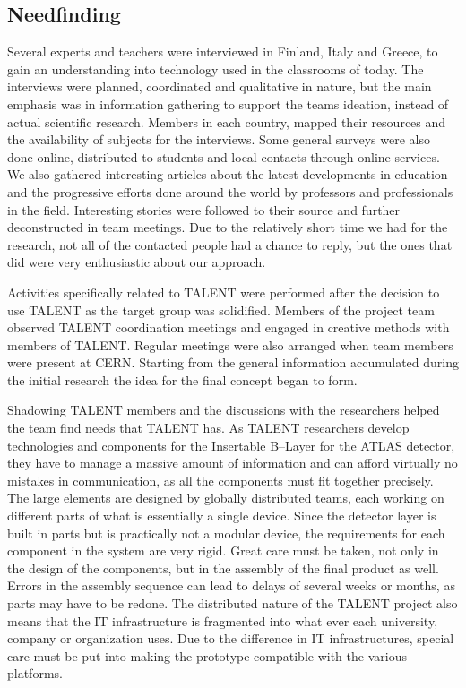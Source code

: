 \documentclass[english,12pt,a4paper,dvips]{article}
\begin{document}
\subsection{Needfinding}

Several experts and teachers were interviewed in Finland, Italy and Greece, to gain an understanding into technology used in the classrooms of today. The interviews were planned, coordinated and qualitative in nature, but the main emphasis was in information gathering to support the teams ideation, instead of actual scientific research. Members in each country, mapped their resources and the availability of subjects for the interviews. Some general surveys were also done online, distributed to students and local contacts through online services. We also gathered interesting articles about the latest developments in education and the progressive efforts done around the world by professors and professionals in the field. Interesting stories were followed to their source and further deconstructed in team meetings. Due to the relatively short time we had for the research, not all of the contacted people had a chance to reply, but the ones that did were very enthusiastic about our approach.

Activities specifically related to TALENT were performed after the decision to use TALENT as the target group was solidified. Members of the project team observed TALENT coordination meetings and engaged in creative methods with members of TALENT. Regular meetings were also arranged when team members were present at CERN. Starting from the general information accumulated during the initial research the idea for the final concept began to form.

Shadowing TALENT members and the discussions with the researchers helped the team find needs that TALENT has. As TALENT researchers develop technologies and components for the Insertable B--Layer for the ATLAS detector, they have to manage a massive amount of information and can afford virtually no mistakes in communication, as all the components must fit together precisely. The large elements are designed by globally distributed teams, each working on different parts of what is essentially a single device. Since the detector layer is built in parts but is practically not a modular device, the requirements for each component in the system are very rigid. Great care must be taken, not only in the design of the components, but in the assembly of the final product as well. Errors in the assembly sequence can lead to delays of several weeks or months, as parts may have to be redone. The distributed nature of the TALENT project also means that the IT infrastructure is fragmented into what ever each university, company or organization uses. Due to the difference in IT infrastructures, special care must be put into making the prototype compatible with the various platforms. 
\end{document}

